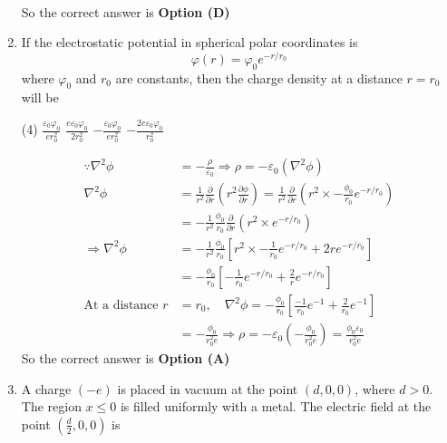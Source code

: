 \begin{enumerate}
\begin{answer}
\begin{align*}
		\end{align*}
		So the correct answer is \textbf{Option (D)}
	\end{answer}
	\item If the electrostatic potential in spherical polar coordinates is
	$$
	\varphi(r)=\varphi_{0} e^{-r / r_{0}}
	$$
	where $\varphi_{0}$ and $r_{0}$ are constants, then the charge density at a distance $r=r_{0}$ will be
	{}
	\begin{tasks}(4)
		\task[\textbf{A.}] $\frac{\varepsilon_{0} \varphi_{0}}{e r_{0}^{2}}$
		\task[\textbf{B.}] $\frac{e \varepsilon_{0} \varphi_{0}}{2 r_{0}^{2}}$
		\task[\textbf{C.}] $-\frac{\varepsilon_{0} \varphi_{0}}{e r_{0}^{2}}$
		\task[\textbf{D.}] $-\frac{2 e \varepsilon_{0} \varphi_{0}}{r_{0}^{2}}$
	\end{tasks}
	\begin{answer}
		\begin{align*}
		\because \nabla^{2} \phi&=-\frac{\rho}{\varepsilon_{0}} \Rightarrow \rho=-\varepsilon_{0}\left(\nabla^{2} \phi\right)\\
		\nabla^{2} \phi&=\frac{1}{r^{2}} \frac{\partial}{\partial r}\left(r^{2} \frac{\partial \phi}{\partial r}\right)=\frac{1}{r^{2}} \frac{\partial}{\partial r}\left(r^{2} \times-\frac{\phi_{0}}{r_{0}} e^{-r / r_{0}}\right)\\&=-\frac{1}{r^{2}} \frac{\phi_{0}}{r_{0}} \frac{\partial}{\partial r}\left(r^{2} \times e^{-r / r_{0}}\right)\\
		\Rightarrow \nabla^{2} \phi&=-\frac{1}{r^{2}} \frac{\phi_{0}}{r_{0}}\left[r^{2} \times-\frac{1}{r_{0}} e^{-r / r_{0}}+2 r e^{-r / r_{0}}\right]\\&=-\frac{\phi_{0}}{r_{0}}\left[-\frac{1}{r_{0}} e^{-r / r_{0}}+\frac{2}{r} e^{-r / r_{0}}\right]\\
		\text{At a distance }r&=r_{0}, \quad \nabla^{2} \phi=-\frac{\phi_{0}}{r_{0}}\left[\frac{-1}{r_{0}} e^{-1}+\frac{2}{r_{0}} e^{-1}\right]\\&=-\frac{\phi_{0}}{r_{0}^{2} e} \Rightarrow \rho=-\varepsilon_{0}\left(-\frac{\phi_{0}}{r_{0}^{2} e}\right)=\frac{\phi_{0} \varepsilon_{0}}{r_{0}^{2} e}
		\end{align*}
		So the correct answer is \textbf{Option (A)}
	\end{answer}
	\item A charge $(-e)$ is placed in vacuum at the point $(d, 0,0)$, where $d>0 .$ The region $x \leq 0$ is filled uniformly with a metal. The electric field at the point $\left(\frac{d}{2}, 0,0\right)$ is
	{}

\end{enumerate}
